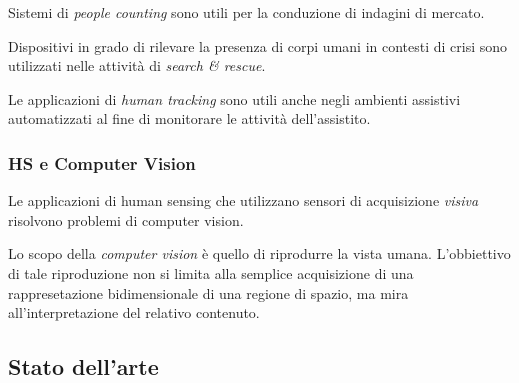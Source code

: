                 Sistemi di \emph{people counting} sono utili per la conduzione di indagini di mercato.

                Dispositivi in grado di rilevare la presenza di corpi umani in contesti di crisi sono utilizzati nelle attività di \emph{search \& rescue}.

                Le applicazioni di \emph{human tracking} sono utili anche negli ambienti assistivi automatizzati al fine di monitorare le attività dell'assistito.

            \subsubsection{HS e Computer Vision}
                Le applicazioni di human sensing che utilizzano sensori di acquisizione \emph{visiva} risolvono problemi di computer vision.

                Lo scopo della \emph{computer vision} è quello di riprodurre la vista umana. L'obbiettivo di tale riproduzione non si limita alla semplice acquisizione di una rappresetazione bidimensionale di una regione di spazio, ma mira all'interpretazione del relativo contenuto.

        \subsection{Stato dell'arte}
